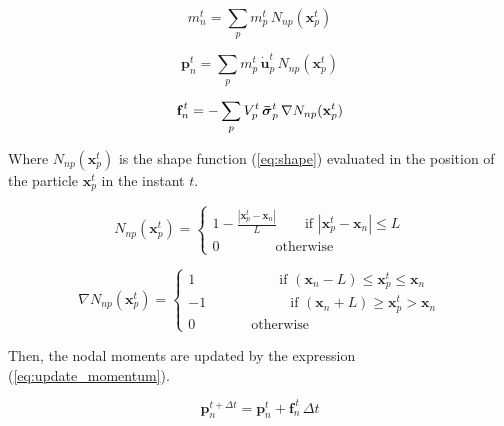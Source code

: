 \documentclass[preprint,12pt]{elsarticle}
\begin{document}
	\begin{equation}
		m_{n}^{t} = \sum_{p}m_{p}^{t}\, N_{np}(\boldsymbol{x}_{p}^{t})
		\label{eq:part_to_node_mass}
	\end{equation}
	
	\begin{equation}
		\textbf{p}_{n}^{t} = \sum_{p}m_{p}^{t}\, \dot{\textbf{u}}_{p}^{t}\, N_{np}(\boldsymbol{x}_{p}^{t})
		\label{eq:part_to_node_momentum}
	\end{equation}
	
	\begin{equation}
		\textbf{f}_{n}^{\,t} = -\sum_{p}V_{p}^{t}\, \boldsymbol{\Bar{\sigma}}_{p}^{t}\, \nabla N_{np}(\textbf{x}_{p}^{t})
		\label{eq:part_to_node_force}
	\end{equation}
	
	\noindent Where $N_{np}(\boldsymbol{x}_p^t)$ is the shape function (\ref{eq:shape}) evaluated in the position of the particle $\boldsymbol{x}_p^t$ in the instant $t$.
	
	\begin{equation}
	    N_{np}(\boldsymbol{x}_p^t) = \left\{\begin{matrix}
                        1-\frac{|\boldsymbol{x}_p^t-\boldsymbol{x}_n|}{L} \qquad \text{if}\,\, |\boldsymbol{x}_p^t-\boldsymbol{x}_n|\leq L\\
                        0 \qquad\qquad \text{otherwise} 
                 \end{matrix}\right.
        \label{eq:shape}
	\end{equation}  
	
	\begin{equation}
	    \nabla N_{np}(\boldsymbol{x}_p^t) = \left\{\begin{matrix}
                        1 \qquad \qquad \qquad \text{if}\,\, (\boldsymbol{x}_n - L) \leq \boldsymbol{x}_p^t \leq \boldsymbol{x}_n \\
                        -1 \qquad \qquad \qquad \text{if}\,\, (\boldsymbol{x}_n + L) \geq \boldsymbol{x}_p^t > \boldsymbol{x}_n \\
                        0 \qquad\qquad \text{otherwise} 
                 \end{matrix}\right.
        \label{eq:shape_diff}
	\end{equation}  
	
    Then, the nodal moments are updated by the expression (\ref{eq:update_momentum}).
    
	\begin{equation}
		\boldsymbol{p}_{n}^{t+\Delta t} = \boldsymbol{p}_{n}^{t}+\boldsymbol{f}_{n}^{\,t}\, \Delta t
		\label{eq:update_momentum}
	\end{equation}
	
\end{document}
